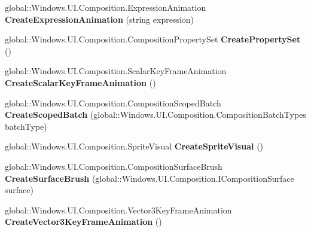 \begin{DoxyCompactItemize}
\item 
\mbox{\label{class_windows_1_1_u_i_1_1_composition_1_1_compositor_ae872b8e5d7605ff92461b38237f26bcf}} 
global\+::\+Windows.\+U\+I.\+Composition.\+Expression\+Animation {\bfseries Create\+Expression\+Animation} (string expression)
\item 
\mbox{\label{class_windows_1_1_u_i_1_1_composition_1_1_compositor_a74091487764434fe783ce2e35bc897d2}} 
global\+::\+Windows.\+U\+I.\+Composition.\+Composition\+Property\+Set {\bfseries Create\+Property\+Set} ()
\item 
\mbox{\label{class_windows_1_1_u_i_1_1_composition_1_1_compositor_a1c091ff2583caeef8359702f57a8ee0d}} 
global\+::\+Windows.\+U\+I.\+Composition.\+Scalar\+Key\+Frame\+Animation {\bfseries Create\+Scalar\+Key\+Frame\+Animation} ()
\item 
\mbox{\label{class_windows_1_1_u_i_1_1_composition_1_1_compositor_a7ffb728cfd21a486270b346127894097}} 
global\+::\+Windows.\+U\+I.\+Composition.\+Composition\+Scoped\+Batch {\bfseries Create\+Scoped\+Batch} (global\+::\+Windows.\+U\+I.\+Composition.\+Composition\+Batch\+Types batch\+Type)
\item 
\mbox{\label{class_windows_1_1_u_i_1_1_composition_1_1_compositor_a74d76a5f9c181cabe102c81e114500ca}} 
global\+::\+Windows.\+U\+I.\+Composition.\+Sprite\+Visual {\bfseries Create\+Sprite\+Visual} ()
\item 
\mbox{\label{class_windows_1_1_u_i_1_1_composition_1_1_compositor_a281e5812822cbd2bb26434f086f15fc2}} 
global\+::\+Windows.\+U\+I.\+Composition.\+Composition\+Surface\+Brush {\bfseries Create\+Surface\+Brush} (global\+::\+Windows.\+U\+I.\+Composition.\+I\+Composition\+Surface surface)
\item 
\mbox{\label{class_windows_1_1_u_i_1_1_composition_1_1_compositor_af205bcd47f5aca9d484b62336a89d804}} 
global\+::\+Windows.\+U\+I.\+Composition.\+Vector3\+Key\+Frame\+Animation {\bfseries Create\+Vector3\+Key\+Frame\+Animation} ()

\end{DoxyCompactItemize}

